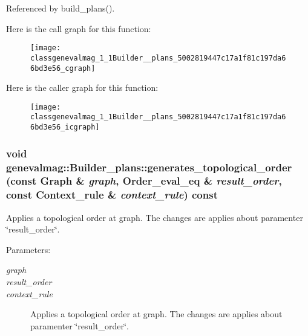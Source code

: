 Referenced by build\_\-plans().

Here is the call graph for this function:\nopagebreak
\begin{figure}[H]
\begin{center}
\leavevmode
\texttt{[image: classgenevalmag\_1\_1Builder\_\_plans\_5002819447c17a1f81c197da66bd3e56\_cgraph]}
\end{center}
\end{figure}


Here is the caller graph for this function:\nopagebreak
\begin{figure}[H]
\begin{center}
\leavevmode
\texttt{[image: classgenevalmag\_1\_1Builder\_\_plans\_5002819447c17a1f81c197da66bd3e56\_icgraph]}
\end{center}
\end{figure}
\hypertarget{classgenevalmag_1_1Builder__plans_9293c2318f2a323616fc49505a44e4e3}{
\subsubsection[{generates\_\-topological\_\-order}]{\setlength{\rightskip}{0pt plus 5cm}void genevalmag::Builder\_\-plans::generates\_\-topological\_\-order (const {\bf Graph} \& {\em graph}, \/  {\bf Order\_\-eval\_\-eq} \& {\em result\_\-order}, \/  const {\bf Context\_\-rule} \& {\em context\_\-rule}) const}}
\label{classgenevalmag_1_1Builder__plans_9293c2318f2a323616fc49505a44e4e3}


Applies a topological order at graph. The changes are applies about paramenter \char`\"{}result\_\-order\char`\"{}. \begin{Desc}
\item[Parameters:]
\begin{description}
\item[{\em graph}]\item[{\em result\_\-order}]\item[{\em context\_\-rule}]Applies a topological order at graph. The changes are applies about paramenter \char`\"{}result\_\-order\char`\"{}. \end{description}
\end{Desc}


